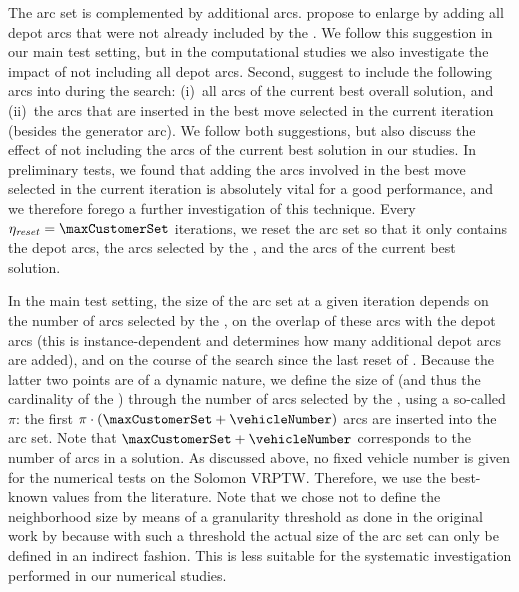 \documentclass[11pt,a4paper,fleqn]{article}
\begin{document}
The \reduced arc set is complemented by additional arcs. \citet{toth:03} propose to enlarge \granularSet by adding all depot arcs that were not already included by the \sm. We follow this suggestion in our main test setting, but in the computational studies we also investigate the impact of not including all depot arcs. Second, \citet{toth:03} suggest to include the following arcs into \granularSet during the search: (i)~all arcs of the current best overall solution, and (ii)~the arcs that are inserted in the best move selected in the current iteration (besides the generator arc). We follow both suggestions, but also discuss the effect of not including the arcs of the current best solution in our studies. In preliminary tests, we found that adding the arcs involved in the best move selected in the current iteration is absolutely vital for a good performance, and we therefore forego a further investigation of this technique. Every $\eta_{\mathit{reset}}=\maxCustomerSet$ iterations, we reset the \reduced arc set so that it only contains the depot arcs, the arcs selected by the \sm, and the arcs of the current best solution. 

In the main test setting, the size of the \reduced arc set at a given iteration depends on the number of arcs selected by the \sm, on the overlap of these arcs with the depot arcs (this is instance-dependent and determines how many additional depot arcs are added), and on the course of the search since the last reset of \granularSet. Because the latter two points are of a dynamic nature, we define the size of \granularSet (and thus the cardinality of the \gn) through the number of arcs selected by the \sm, using a so-called \emph{\sfa} $\pi$: the first $\pi \cdot (\maxCustomerSet+\vehicleNumber)$ arcs are inserted into the \reduced arc set. Note that $\maxCustomerSet+\vehicleNumber$ corresponds to the number of arcs in a solution. As discussed above, no fixed vehicle number is given for the numerical tests on the Solomon VRPTW. Therefore, we use the best-known values from the literature. Note that we chose not to define the neighborhood size by means of a granularity threshold as done in the original work by \citet{toth:03} because with such a threshold the actual size of the \reduced arc set can only be defined in an indirect fashion. This is less suitable for the systematic investigation performed in our numerical studies.
\end{document}

